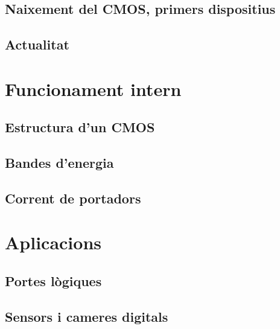 \documentclass[11pt,a4paper]{article}
\begin{document}
\subsection{Naixement del CMOS, primers dispositius}

\subsection{Actualitat}

\section{Funcionament intern}

\subsection{Estructura d'un CMOS}

\subsection{Bandes d'energia}

\subsection{Corrent de portadors}


\section{Aplicacions}

\subsection{Portes lògiques}

\subsection{Sensors i cameres digitals}

\printbibliography
\end{document}

